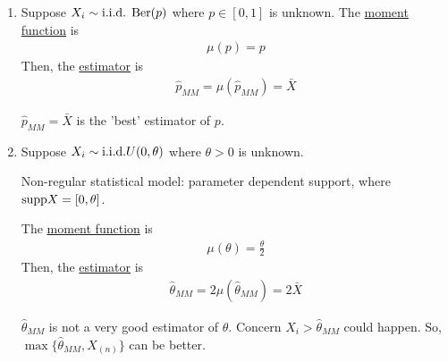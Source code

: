 \documentclass[11pt]{elegantbook}
\begin{document}
\begin{example}\quad
    \begin{enumerate}
        \item Suppose $X_i\sim \textnormal{i.i.d. Ber}(p)$ where $p\in[0,1]$ is unknown. The \underline{moment function} is
        \begin{equation}
            \begin{aligned}
                \mu(p)=p
            \end{aligned}
            \nonumber
        \end{equation}
        Then, the \underline{estimator} is
        \begin{equation}
            \begin{aligned}
                \hat{p}_{MM}=\mu(\hat{p}_{MM})=\bar{X}
            \end{aligned}
            \nonumber
        \end{equation}
        \begin{remark}
            $\hat{p}_{MM}=\bar{X}$ is the 'best' estimator of $p$.
        \end{remark}
        \item Suppose $X_i\sim \textnormal{i.i.d.}U(0,\theta)$ where $\theta>0$ is unknown.\\
        \begin{remark}
            Non-regular statistical model: parameter dependent support, where $\textnormal{supp}X=[0,\theta]$.
        \end{remark}
        The \underline{moment function} is
        \begin{equation}
            \begin{aligned}
                \mu(\theta)=\frac{\theta}{2}
            \end{aligned}
            \nonumber
        \end{equation}
        Then, the \underline{estimator} is
        \begin{equation}
            \begin{aligned}
                \hat{\theta}_{MM}=2\mu(\hat{\theta}_{MM})=2\bar{X}
            \end{aligned}
            \nonumber
        \end{equation}
        \begin{remark}
            $\hat{\theta}_{MM}$ is not a very good estimator of $\theta$. Concern $X_i>\hat{\theta}_{MM}$ could happen. So, $\max\{\hat{\theta}_{MM},X_{(n)}\}$ can be better.
        \end{remark}
    \end{enumerate}
\end{example}
\end{document}
